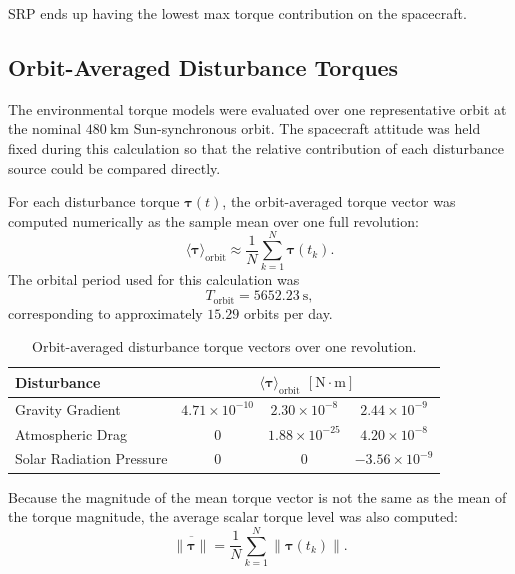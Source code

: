 SRP ends up having the lowest max torque contribution on the spacecraft.

\subsection{Orbit-Averaged Disturbance Torques}
\label{sec:orbit_avg_disturbances}

The environmental torque models were evaluated over one representative orbit at the
nominal $480~\mathrm{km}$ Sun-synchronous orbit. The spacecraft attitude was held fixed
during this calculation so that the relative contribution of each disturbance source could be
compared directly.

For each disturbance torque $\boldsymbol{\tau}(t)$, the orbit-averaged torque vector was
computed numerically as the sample mean over one full revolution:
\begin{equation}
    \langle \boldsymbol{\tau} \rangle_{\mathrm{orbit}}
    \approx
    \frac{1}{N}\sum_{k=1}^{N}\boldsymbol{\tau}(t_k).
\end{equation}
The orbital period used for this calculation was
\begin{equation}
    T_{\mathrm{orbit}} = 5652.23~\mathrm{s},
\end{equation}
corresponding to approximately $15.29$ orbits per day.

\begin{table}[H]
    \centering
    \caption{Orbit-averaged disturbance torque vectors over one revolution.}
    \label{tab:orbit_avg_torque_vectors}
    \begin{tabular}{lccc}
        \hline
        \textbf{Disturbance} &
        \multicolumn{3}{c}{\textbf{$\langle \boldsymbol{\tau} \rangle_{\mathrm{orbit}}$ $[\mathrm{N\cdot m}]$}} \\
        \hline
        Gravity Gradient &
        $4.71\times10^{-10}$ & $2.30\times10^{-8}$ & $2.44\times10^{-9}$ \\
        Atmospheric Drag &
        $0$ & $1.88\times10^{-25}$ & $4.20\times10^{-8}$ \\
        Solar Radiation Pressure &
        $0$ & $0$ & $-3.56\times10^{-9}$ \\
        \hline
    \end{tabular}
\end{table}

Because the magnitude of the mean torque vector is not the same as the mean of the torque
magnitude, the average scalar torque level was also computed:
\begin{equation}
    \overline{\|\boldsymbol{\tau}\|}
    =
    \frac{1}{N}\sum_{k=1}^{N}\|\boldsymbol{\tau}(t_k)\|.
\end{equation}

